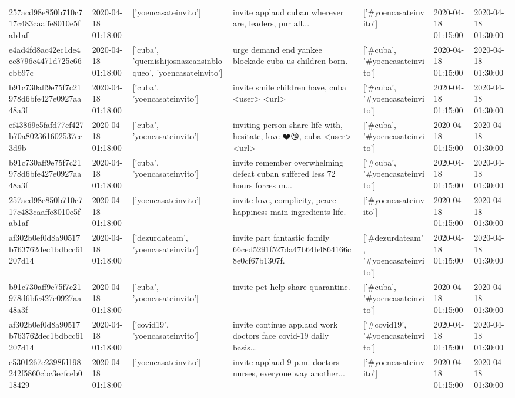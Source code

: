\begin{tabular}{lllllll}
257acd98e850b710c717c483caaffe8010e5fab1af & 2020-04-18 01:18:00 & ['yoencasateinvito'] & invite applaud cuban wherever are, leaders, pnr all... & ['#yoencasateinvito'] & 2020-04-18 01:15:00 & 2020-04-18 01:30:00 \\
e4ad4fd8ac42ec1de4cc8796c4471d725c66cbb97c & 2020-04-18 01:18:00 & ['cuba', 'quemishijosnazcansinbloqueo', 'yoencasateinvito'] & urge demand end yankee blockade cuba us children born. & ['#cuba', '#yoencasateinvito'] & 2020-04-18 01:15:00 & 2020-04-18 01:30:00 \\
b91c730aff9e75f7c21978d6bfe427e0927aa48a3f & 2020-04-18 01:18:00 & ['cuba', 'yoencasateinvito'] & invite smile children have, cuba <user> <url> & ['#cuba', '#yoencasateinvito'] & 2020-04-18 01:15:00 & 2020-04-18 01:30:00 \\
ef43869c5fafd77cf427b70a802361602537ec3d9b & 2020-04-18 01:18:00 & ['cuba', 'yoencasateinvito'] & inviting person share life with, hesitate, love ❤️😘, cuba <user> <url> & ['#cuba', '#yoencasateinvito'] & 2020-04-18 01:15:00 & 2020-04-18 01:30:00 \\
b91c730aff9e75f7c21978d6bfe427e0927aa48a3f & 2020-04-18 01:18:00 & ['cuba', 'yoencasateinvito'] & invite remember overwhelming defeat cuban suffered less 72 hours forces m... & ['#cuba', '#yoencasateinvito'] & 2020-04-18 01:15:00 & 2020-04-18 01:30:00 \\
257acd98e850b710c717c483caaffe8010e5fab1af & 2020-04-18 01:18:00 & ['yoencasateinvito'] & invite love, complicity, peace happiness main ingredients life. & ['#yoencasateinvito'] & 2020-04-18 01:15:00 & 2020-04-18 01:30:00 \\
af302b0ef0d8a90517b763762dec1bdbcc61207d14 & 2020-04-18 01:18:00 & ['dezurdateam', 'yoencasateinvito'] & invite part fantastic family 66ced5291f527da47b64b4864166c8e0cf67b1307f. & ['#dezurdateam', '#yoencasateinvito'] & 2020-04-18 01:15:00 & 2020-04-18 01:30:00 \\
b91c730aff9e75f7c21978d6bfe427e0927aa48a3f & 2020-04-18 01:18:00 & ['cuba', 'yoencasateinvito'] & invite pet help share quarantine. & ['#cuba', '#yoencasateinvito'] & 2020-04-18 01:15:00 & 2020-04-18 01:30:00 \\
af302b0ef0d8a90517b763762dec1bdbcc61207d14 & 2020-04-18 01:18:00 & ['covid19', 'yoencasateinvito'] & invite continue applaud work doctors face covid-19 daily basis... & ['#covid19', '#yoencasateinvito'] & 2020-04-18 01:15:00 & 2020-04-18 01:30:00 \\
e5301267e2398fd198242f5860cbc3ecfceb018429 & 2020-04-18 01:18:00 & ['yoencasateinvito'] & invite applaud 9 p.m. doctors nurses, everyone way another... & ['#yoencasateinvito'] & 2020-04-18 01:15:00 & 2020-04-18 01:30:00 \\

\end{tabular}

